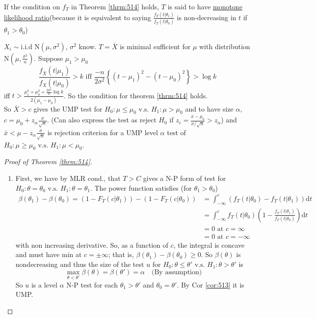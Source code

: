 \documentclass[english, 11pt]{article}
\begin{document}
\begin{defn}[(*)]\label{defn:515}
If the condition on $f_T$ in Theorem \ref{thrm:514} holds, $T$ is said to have \underline{monotone likelihood ratio}(because it is equivalent to saying $\frac{f_T(t|\theta_1)}{f_T(t|\theta_0)}$ is non-decreasing in $t$ if $\theta_1>\theta_0$)
\end{defn}
\begin{exmp}
$X_i\sim\text{i.i.d~N}(\mu, \sigma^2)$, $\sigma^2$ know. $T=\bar{X}$ is minimal sufficient for $\mu$ with distribution N$(\mu, \frac{\sigma^2}{n})$. Suppose $\mu_1>\mu_0$
$$
\frac{f_{\bar{X}}(t|\mu_1)}{f_{\bar{X}}(t|\mu_0)}>k\text{ iff }\frac{-n}{2\sigma^2}\left\{(t-\mu_1)^2-(t-\mu_0)^2\right\}>\log k
$$
iff $t>\frac{\mu_1^2+\mu_0^2+\frac{2\sigma^2}{n} \log k}{2(\mu_1-\mu_0)}$.
So the condition for theorem \ref{thrm:514} holds.\\
So $\bar{X}>c$ gives the UMP test for $H_0:\mu\leqslant \mu_0\text{ v.s. }H_1:\mu>\mu_0$ and to have size $\alpha$, $c=\mu_0+z_\alpha\frac{\sigma}{\sqrt{n}}$. (Can also express the test as reject $H_0$ if $z_c=\frac{\bar{x}-\mu_0}{\sigma/\sqrt{n}}>z_\alpha$) and $\bar{x}<\mu-z_\alpha\frac{\sigma}{\sqrt{n}}$ is rejection criterion for a UMP level $\alpha$ test of $H_0:\mu\geqslant\mu_0\text{ v.s. }H_1:\mu<\mu_0$.
\end{exmp}
\begin{proof}[Proof of Theorem \ref{thrm:514}]
\begin{enumerate}
\item First, we have by MLR cond., that $T>C$ gives a N-P form of test for $H_0:\theta=\theta_0\text{ v.s. }H_1:\theta=\theta_1$. The power function satisfies (for $\theta_1>\theta_0$)
$$
\begin{aligned}
\beta(\theta_1)-\beta(\theta_0)=(1-F_T(c|\theta_1))-(1-F_T(c|\theta_0))&=\int_{-\infty}^c(f_T(t|\theta_0)-f_T(t|\theta_1))\mathrm{d}t\\
&=\int_{-\infty}^cf_T(t|\theta_0)\left(1-\frac{f_T(t|\theta_1)}{f_T(t|\theta_0)}\right)\mathrm{d}t\\
&=0\text{ at }c=\infty\\
&=0\text{ at }c=-\infty
\end{aligned}
$$
with non increasing derivative. So, as a function of $c$, the integral is concave and must have min at $c=\pm\infty$; that is, $\beta(\theta_1)-\beta(\theta_0)\geqslant 0$. So $\beta(\theta)$ is nondecreasing and thus the size of the test $u$ for $H_0:\theta\leqslant\theta'\text{ v.s. }H_1:\theta>\theta'$ is 
$$
\max_{\theta<\theta'}\beta(\theta)=\beta(\theta')=\alpha\quad\text{(By assumption)}
$$
So $u$ is a level $\alpha$ N-P test for each $\theta_1>\theta'$ and $\theta_0=\theta'$. By Cor \ref{cor:513} it is UMP.
\end{enumerate}
\end{proof}
\end{document}
